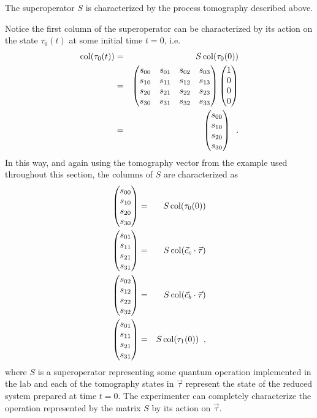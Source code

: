 The superoperator $S$ is characterized by the process tomography described above.  
\begin{example}
Notice the first column of the superoperator can be characterized by its action on the state $\tau_0(t)$ at some initial time $t=0$, i.e.\
\begin{eqnarray*}
\operatorname{col}(\tau_0(t)) &=& S \operatorname{col}(\tau_0(0))\\ 
&=& \begin{pmatrix}
s_{00} & s_{01} & s_{02} & s_{03}\\
s_{10} & s_{11} & s_{12} & s_{13}\\
s_{20} & s_{21} & s_{22} & s_{23}\\
s_{30} & s_{31} & s_{32} & s_{33}
\end{pmatrix} \begin{pmatrix}
1\\
0\\
0\\
0
\end{pmatrix}\\
&=& \begin{pmatrix}
s_{00}\\
s_{10}\\
s_{20}\\
s_{30}
\end{pmatrix}\;\;.
\end{eqnarray*}
In this way, and again using the tomography vector from the example used throughout this section, the columns of $S$ are characterized as
\begin{eqnarray*}
\begin{pmatrix}
s_{00}\\
s_{10}\\
s_{20}\\
s_{30}
\end{pmatrix} &=& S \operatorname{col}(\tau_0(0))\\
\begin{pmatrix}
s_{01}\\
s_{11}\\
s_{21}\\
s_{31}
\end{pmatrix} &=& S \operatorname{col}(\vec{c}_c\cdot\vec{\tau})\\
\begin{pmatrix}
s_{02}\\
s_{12}\\
s_{22}\\
s_{32}
\end{pmatrix} &=& S \operatorname{col}(\vec{c}_b\cdot\vec{\tau})\\
\begin{pmatrix}
s_{01}\\
s_{11}\\
s_{21}\\
s_{31}
\end{pmatrix} &=& S \operatorname{col}(\tau_1(0))\;\;,
\end{eqnarray*}
where $S$ is a superoperator representing some quantum operation implemented in the lab and each of the tomography states in $\vec{\tau}$ represent the state of the reduced system prepared at time $t=0$.  The experimenter can completely characterize the operation represented by the matrix $S$ by its action on $\vec{\tau}$.    
\end{example}

